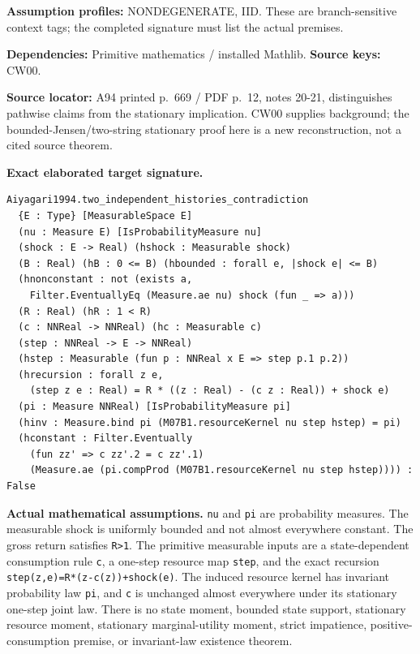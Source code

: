 \documentclass[
  11pt,
]{article}
\let\LedgerOriginalTexttt\texttt
\renewcommand{\texttt}[1]{{\small\LedgerOriginalTexttt{#1}}}
\begin{document}
\textbf{Assumption profiles:} NONDEGENERATE, IID. These are
branch-sensitive context tags; the completed signature must list the
actual premises.

\textbf{Dependencies:} Primitive mathematics / installed Mathlib.
\textbf{Source keys:} CW00.

\textbf{Source locator:} A94 printed p.~669 / PDF p.~12, notes 20-21,
distinguishes pathwise claims from the stationary implication. CW00
supplies background; the bounded-Jensen/two-string stationary proof here
is a new reconstruction, not a cited source theorem.

\textbf{Exact elaborated target signature.}

\begin{verbatim}
Aiyagari1994.two_independent_histories_contradiction
  {E : Type} [MeasurableSpace E]
  (nu : Measure E) [IsProbabilityMeasure nu]
  (shock : E -> Real) (hshock : Measurable shock)
  (B : Real) (hB : 0 <= B) (hbounded : forall e, |shock e| <= B)
  (hnonconstant : not (exists a,
    Filter.EventuallyEq (Measure.ae nu) shock (fun _ => a)))
  (R : Real) (hR : 1 < R)
  (c : NNReal -> NNReal) (hc : Measurable c)
  (step : NNReal -> E -> NNReal)
  (hstep : Measurable (fun p : NNReal x E => step p.1 p.2))
  (hrecursion : forall z e,
    (step z e : Real) = R * ((z : Real) - (c z : Real)) + shock e)
  (pi : Measure NNReal) [IsProbabilityMeasure pi]
  (hinv : Measure.bind pi (M07B1.resourceKernel nu step hstep) = pi)
  (hconstant : Filter.Eventually
    (fun zz' => c zz'.2 = c zz'.1)
    (Measure.ae (pi.compProd (M07B1.resourceKernel nu step hstep)))) : False
\end{verbatim}

\textbf{Actual mathematical assumptions.} \texttt{nu} and \texttt{pi}
are probability measures. The measurable shock is uniformly bounded and
not almost everywhere constant. The gross return satisfies
\texttt{R\textgreater{}1}. The primitive measurable inputs are a
state-dependent consumption rule \texttt{c}, a one-step resource map
\texttt{step}, and the exact recursion
\texttt{step(z,e)=R*(z-c(z))+shock(e)}. The induced resource kernel has
invariant probability law \texttt{pi}, and \texttt{c} is unchanged
almost everywhere under its stationary one-step joint law. There is no
state moment, bounded state support, stationary resource moment,
stationary marginal-utility moment, strict impatience,
positive-consumption premise, or invariant-law existence theorem.
\end{document}
